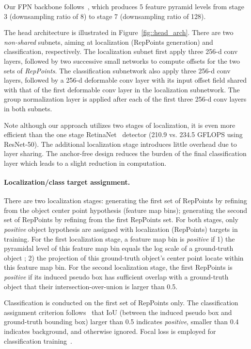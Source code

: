 \documentclass[10pt,twocolumn,letterpaper]{article}
\begin{document}
Our FPN backbone follows~\cite{RetinaNet}, which produces 5 feature pyramid levels from stage 3 (downsampling ratio of 8) to stage 7 (downsampling ratio of 128). 

The head architecture is illustrated in Figure~\ref{fig::head_arch}. There are two \emph{non-shared} subnets, aiming at localization (RepPoints generation) and classification, respectively. The localization subnet first apply three 256-d  conv layers, followed by two successive small networks to compute offsets for the two sets of \emph{RepPoints}. The classification subnetwork also apply three 256-d  conv layers, followed by a 256-d  deformable conv layer with its input offset field shared with that of the first deformable conv layer in the localization subnetwork. The group normalization layer is applied after each of the first three 256-d  conv layers in both subnets. 

Note although our approach utilizes two stages of localization, it is even more efficient than the one stage RetinaNet~\cite{RetinaNet} detector (210.9 vs. 234.5 GFLOPS using ResNet-50). The
additional localization stage introduces little overhead due to layer sharing. The anchor-free design reduces the burden of the final classification layer which leads to a slight reduction in computation.

\vspace{-5pt}
\paragraph{Localization/class target assignment.} 
There are two localization stages: generating the first set of RepPoints by refining from the object center point hypothesis (feature map bins); generating the second set of RepPoints by refining from the first RepPoints set. For both stages, only \emph{positive} object hypothesis are assigned with localization (RepPoints) targets in training. For the first localization stage, a feature map bin is \emph{positive} if 1) the pyramidal level of this feature map bin equals the log scale of a ground-truth object ; 2) the projection of this ground-truth object's center point locate within this feature map bin. For the second localization stage, the first RepPoints is \emph{positive} if its induced pseudo box has sufficient overlap with a ground-truth object that their intersection-over-union is larger than 0.5.

Classification is conducted on the first set of RepPoints only. The classification assignment criterion follows~\cite{RetinaNet} that IoU (between the induced pseudo box and ground-truth bounding box) larger than 0.5 indicates \emph{positive}, smaller than 0.4 indicates background, and otherwise ignored. Focal loss is employed for classification training~\cite{RetinaNet}.
\end{document}
